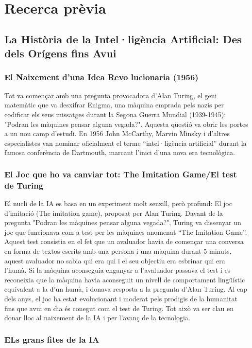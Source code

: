 \chapter{Recerca prèvia}
\label{c:recerca prèvia}
\section{La Història de la Intel·ligència Artificial: Des dels Orígens fins Avui}
\subsection{El Naixement d'una Idea Revo lucionaria (1956)}
Tot va començar amb una pregunta provocadora d’Alan Turing, el geni matemàtic que va desxifrar Enigma, una màquina emprada pels nazis per codificar els seus missatges durant la Segona Guerra Mundial (1939-1945): "Podran les màquines pensar alguna vegada?". Aquesta qüestió va obrir les portes a un nou camp d’estudi. En 1956 John McCarthy, Marvin Minsky i d'altres especialistes van nominar oficialment el terme ``intel·ligència artificial'' durant la famosa conferència de Dartmouth, marcant l'inici d'una nova era tecnològica.
\subsection{El Joc que ho va canviar tot: The Imitation Game/El test de Turing}
El nucli de la IA es basa en un experiment molt senzill, però profund: El joc d'imitació (The imitation game), proposat per Alan Turing. Davant de la pregunta "Podran les màquines pensar alguna vegada?", Turing va dissenyar un joc que funcionava com a test per les màquines anomenat ``The Imitation Game''. Aquest test consistia en el fet que un avaluador havia de començar una conversa en forma de textos escrits amb una persona i una màquina durant 5 minuts, aquest avaluador no sabia qui era qui i el seu objectiu era esbrinar qui era l'humà. Si la màquina aconseguia enganyar a l'avaluador passava el test i es reconeixia que la màquina havia aconseguit un nivell de comportament lingüístic equivalent a la d'un humà, i donava resposta a la pregunta d'Alan Turing. Al cap dels anys, el joc ha estat evolucionant i moderat pels prodigis de la humanitat fins que avui en dia és conegut com el test de Turing. Tot això va ser clau en donar lloc al naixement de la IA i per l'avanç de la tecnologia.
\subsection{ELs grans fites de la IA}

